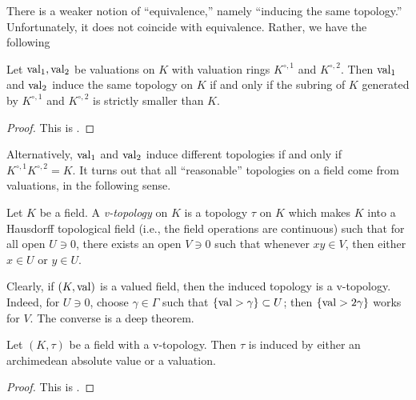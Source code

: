 There is a weaker notion of ``equivalence,'' namely ``inducing the same 
topology.'' Unfortunately, it does not coincide with equivalence. Rather, we 
have the following 

\begin{theorem}
Let $\operatorname{val}_1,\operatorname{val}_2$ be valuations on $K$ with valuation rings 
$K^{\circ,1}$ and $K^{\circ,2}$. Then $\operatorname{val}_1$ and $\operatorname{val}_2$ induce 
the same topology on $K$ if and only if the subring of $K$ generated by 
$K^{\circ,1}$ and $K^{\circ,2}$ is strictly smaller than $K$. 
\end{theorem}
\begin{proof}
This is \cite[2.3.4]{engler-prestel}. 
\end{proof}

Alternatively, $\operatorname{val}_1$ and $\operatorname{val}_2$ induce different topologies if 
and only if $K^{\circ,1}K^{\circ,2} = K$. It turns out that all ``reasonable'' 
topologies on a field come from valuations, in the following sense. 

\begin{definition}
Let $K$ be a field. A \emph{v-topology} on $K$ is a topology $\tau$ on $K$ 
which makes $K$ into a Hausdorff topological field (i.e., the field operations 
are continuous) such that for all open $U\ni 0$, there exists an open 
$V\ni 0$ such that whenever $x y\in V$, then either $x\in U$ or $y\in U$. 
\end{definition}

Clearly, if $(K,\operatorname{val})$ is a valued field, then the induced topology is 
a v-topology. Indeed, for $U\ni 0$, choose $\gamma\in \Gamma$ such that 
$\{\operatorname{val}>\gamma\}\subset U$; then $\{\operatorname{val}>2\gamma\}$ works for $V$. 
The converse is a deep theorem.

\begin{theorem}
Let $(K,\tau)$ be a field with a v-topology. Then $\tau$ is induced by either 
an archimedean absolute value or a valuation. 
\end{theorem}
\begin{proof}
This is \cite[B.1]{engler-prestel}.
\end{proof}

